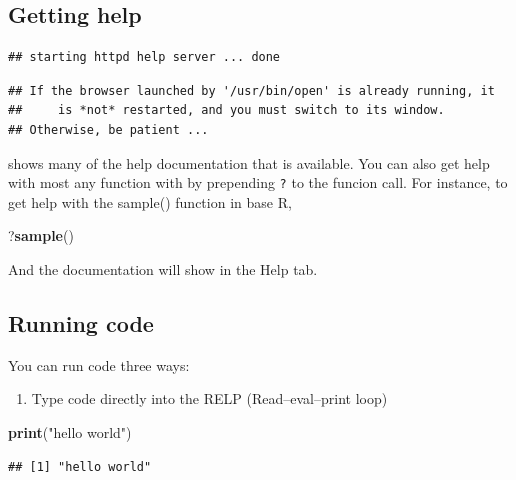 \documentclass[]{book}
\newenvironment{Shaded}{\begin{snugshade}}{\end{snugshade}}
\newcommand{\KeywordTok}[1]{\textcolor[rgb]{0.13,0.29,0.53}{\textbf{#1}}}
\newcommand{\NormalTok}[1]{#1}
\newcommand{\StringTok}[1]{\textcolor[rgb]{0.31,0.60,0.02}{#1}}
\providecommand{\tightlist}{%
  \setlength{\itemsep}{0pt}\setlength{\parskip}{0pt}}
\begin{document}
\hypertarget{getting-help}{%
\subsection{Getting help}\label{getting-help}}

\begin{verbatim}
## starting httpd help server ... done
\end{verbatim}

\begin{verbatim}
## If the browser launched by '/usr/bin/open' is already running, it
##     is *not* restarted, and you must switch to its window.
## Otherwise, be patient ...
\end{verbatim}

shows many of the help documentation that is available. You can also get help with most any function with by prepending \texttt{?} to the funcion call. For instance, to get help with the sample() function in base R,

\begin{Shaded}
\begin{Highlighting}[]
\NormalTok{?}\KeywordTok{sample}\NormalTok{()}
\end{Highlighting}
\end{Shaded}

And the documentation will show in the Help tab.

\hypertarget{running-code}{%
\subsection{Running code}\label{running-code}}

You can run code three ways:

\begin{enumerate}
\def\labelenumi{\arabic{enumi}.}
\tightlist
\item
  Type code directly into the RELP (Read--eval--print loop)
\end{enumerate}

\begin{Shaded}
\begin{Highlighting}[]
\KeywordTok{print}\NormalTok{(}\StringTok{"hello world"}\NormalTok{)}
\end{Highlighting}
\end{Shaded}

\begin{verbatim}
## [1] "hello world"
\end{verbatim}
\end{document}
